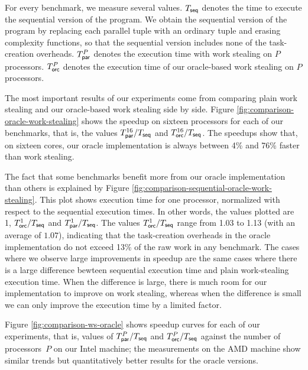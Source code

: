 For every benchmark, we measure several values.
$T_{\textsf{seq}}$ denotes
the time to execute the sequential version of the program.
We obtain the sequential version of the program by replacing each 
parallel tuple with an ordinary tuple and erasing complexity functions,
so that the sequential version includes none of the task-creation overheads.
$T_{\textsf{par}}^P$ denotes the execution time with work stealing on $P$ processors.
$T_{\textsf{orc}}^P$ denotes the execution time of our 
oracle-based work stealing on $P$ processors.

The most important results of our experiments come from comparing
plain work stealing and our oracle-based work stealing side by
side. Figure \ref{fig:comparison-oracle-work-stealing} shows the
speedup on sixteen processors for each of our benchmarks,
that is, the values $T_{\textsf{par}}^{16}/T_{\textsf{seq}}$ and $T_{\textsf{orc}}^{16}/T_{\textsf{seq}}$.
The speedups show that, on sixteen cores, our oracle implementation is
always between 4\% and 76\% faster than work stealing. 

The fact that some benchmarks benefit more from our oracle implementation 
than others is explained by Figure
\ref{fig:comparison-sequential-oracle-work-stealing}. This plot shows
execution time for one processor, normalized with respect to the  
sequential execution times. In other words, the values plotted
are 1, $T_{\textsf{orc}}^{1}/T_{\textsf{seq}}$ and $T_{\textsf{par}}^{1}/T_{\textsf{seq}}$.
The values $T_{\textsf{orc}}^{1}/T_{\textsf{seq}}$ range from 1.03 to 1.13 (with an average
of $1.07$), indicating that the task-creation overheads in the oracle 
implementation do not exceed 13\% of the raw work in any benchmark.
The cases where we observe large improvements in speedup are the same
cases where there is a large difference bewteen sequential execution
time and plain work-stealing execution time. When the difference is
large, there is much room for our implementation to improve on work
stealing, whereas when the difference is small
we can only improve the execution time by a limited factor.

Figure \ref{fig:comparison-ws-oracle} shows speedup curves for each of
our experiments, that is, values of $T_{\textsf{par}}^{P}/T_{\textsf{seq}}$ and 
$T_{\textsf{orc}}^{P}/T_{\textsf{seq}}$ against the number of processors~$P$ on our
Intel machine; the measurements on the AMD machine show similar trends
but quantitatively better results for the oracle versions.   

